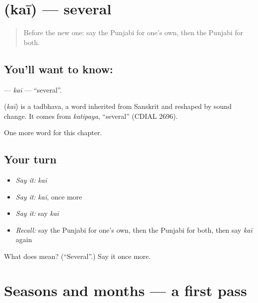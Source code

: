 \section[\texorpdfstring{\pa{ਕਈ} (kaī)}{ਕਈ (kaī)}]{ (kaī) — several}

\label{lesson:PA-C107-kai}



\begin{quote}
Before the new one: say the Punjabi for one's own, then the Punjabi for both.
\end{quote}

\subsection*{You'll want to know: }
\textbf{} — \emph{kaī} — \textquotedblleft{}several\textquotedblright{}.

\begin{cousinweb}
\textbf{} (\emph{kaī}) is a tadbhava, a word inherited from Sanskrit and reshaped by sound change. It comes from \emph{katipaya}, \textquotedblleft{}several\textquotedblright{} (CDIAL 2696).
\end{cousinweb}

\begin{grammarlens}[title={What you've built}]
One more word for this chapter.
\end{grammarlens}

\subsection*{Your turn}
\begin{itemize}
\raggedright
  \item \emph{Say it:} \emph{kaī}
  \item \emph{Say it:} \emph{kaī}, once more
  \item \emph{Say it:} say \emph{kaī}
  \item \emph{Recall:} say the Punjabi for one's own, then the Punjabi for both, then say \emph{kaī} again
\end{itemize}

\begin{tcolorbox}[breakable,colback=teal!4,colframe=teal!35!black,title={Before you move on}]
What does  mean? (\textquotedblleft{}Several\textquotedblright{}.) Say it once more.
\end{tcolorbox}
\section[(dialogue)]{Seasons and months — a first pass}

